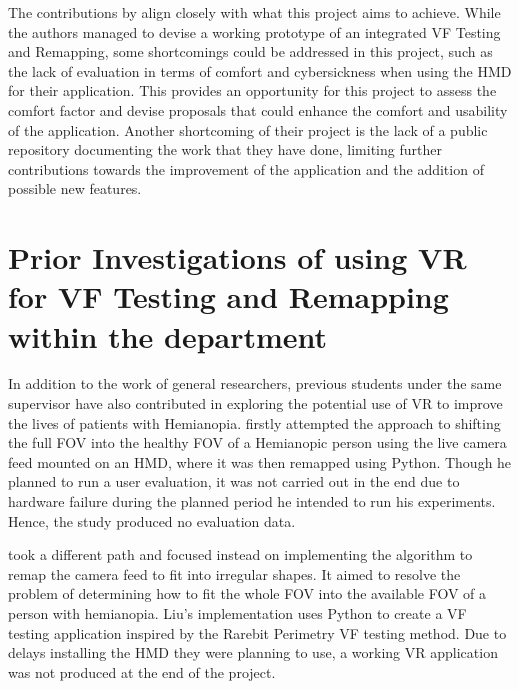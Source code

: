 \documentclass{l4proj}
\begin{document}
The contributions by \cite{Sayed2020ExpansionSpectacles} align closely with what this project aims to achieve. While the authors managed to devise a working prototype of an integrated VF Testing and Remapping, some shortcomings could be addressed in this project, such as the lack of evaluation in terms of comfort and cybersickness when using the HMD for their application. This provides an opportunity for this project to assess the comfort factor and devise proposals that could enhance the comfort and usability of the application. Another shortcoming of their project is the lack of a public repository documenting the work that they have done, limiting further contributions towards the improvement of the application and the addition of possible new features.


\section{Prior Investigations of using VR for VF Testing and Remapping within the department}

In addition to the work of general researchers, previous students under the same supervisor have also contributed in exploring the potential use of VR to improve the lives of patients with Hemianopia. \cite{Garcia2021} firstly attempted the approach to shifting the full FOV into the healthy FOV of a Hemianopic person using the live camera feed mounted on an HMD, where it was then remapped using Python. Though he planned to run a user evaluation, it was not carried out in the end due to hardware failure during the planned period he intended to run his experiments. Hence, the study produced no evaluation data. 

\cite{Liu2022VisualHemianopia} took a different path and focused instead on implementing the algorithm to remap the camera feed to fit into irregular shapes. It aimed to resolve the problem of determining how to fit the whole FOV into the available FOV of a person with hemianopia. Liu's implementation uses Python to create a VF testing application inspired by the Rarebit Perimetry VF testing method. Due to delays installing the HMD they were planning to use, a working VR application was not produced at the end of the project.
\end{document}
